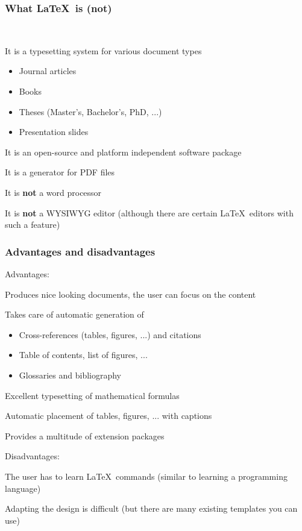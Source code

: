 \documentclass{tum-presentation}
\begin{document}
\begin{frame}
\frametitle{What \LaTeX~is (not)}

~
\begin{PraesentationAufzaehlung}
\item It is a typesetting system for various document types
  \begin{itemize}
  \item Journal articles
  \item Books
  \item Theses (Master's, Bachelor's, PhD, ...)
  \item Presentation slides
  \end{itemize}
\item It is an open-source and platform independent software package
\item It is a generator for PDF files
\item It is \textbf{not} a word processor
\item It is \textbf{not} a WYSIWYG editor (although there are certain \LaTeX~editors with such a feature)
\end{PraesentationAufzaehlung}

\end{frame}

\begin{frame}
\frametitle{Advantages and disadvantages}

Advantages:
\begin{PraesentationAufzaehlung}
\item Produces nice looking documents, the user can focus on the content
\item Takes care of automatic generation of
  \begin{itemize}
  \item Cross-references (tables, figures, ...) and citations
  \item Table of contents, list of figures, ...
  \item Glossaries and bibliography
  \end{itemize}
\item Excellent typesetting of mathematical formulas
\item Automatic placement of tables, figures, ... with captions
\item Provides a multitude of extension packages
\end{PraesentationAufzaehlung}

Disadvantages:
\begin{PraesentationAufzaehlung}
\item The user has to learn \LaTeX~commands (similar to learning a programming language)
\item Adapting the design is difficult (but there are many existing templates you can use)
\end{PraesentationAufzaehlung}
\end{frame}
\end{document}

